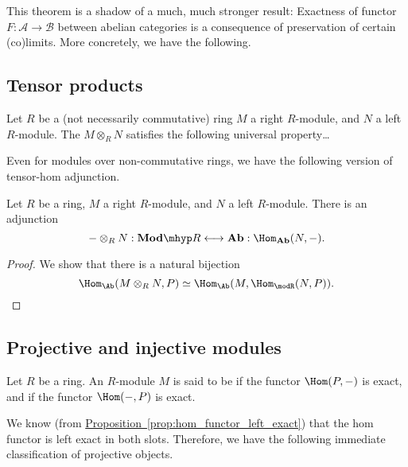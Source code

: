 \documentclass[main.tex]{subfiles}
\begin{document}
This theorem is a shadow of a much, much stronger result: Exactness of functor $F\colon \mathcal{A} \to \mathcal{B}$ between abelian categories is a consequence of preservation of certain (co)limits. More concretely, we have the following.

\subsection{Tensor products}
\label{ssc:tensor_products}

\begin{definition}
  \label{def:tensor_product}
  Let $R$ be a (not necessarily commutative) ring $M$ a right $R$-module, and $N$ a left $R$-module. The  $M \otimes_{R} N$ satisfies the following universal property\dots
\end{definition}

Even for modules over non-commutative rings, we have the following version of tensor-hom adjunction.
\begin{proposition}
  Let $R$ be a ring, $M$ a right $R$-module, and $N$ a left $R$-module. There is an adjunction
  \begin{equation*}
    - \otimes_{R} N : \mathbf{Mod}\mhyp R \longleftrightarrow \mathbf{Ab} : \Hom_{\mathbf{Ab}}(N, -).
  \end{equation*}
\end{proposition}
\begin{proof}
  We show that there is a natural bijection
  \begin{equation*}
    \Hom_{\Ab}(M \otimes_{R} N, P) \simeq \Hom_{\Ab}(M, \Hom_{\modR}(N, P)).
  \end{equation*}
\end{proof}

\subsection{Projective and injective modules}
\label{ssc:projective_and_injective_modules}

\begin{definition}
  \label{def:projective_injective_module}
  Let $R$ be a ring. An $R$-module $M$ is said to be  if the functor $\Hom(P, -)$ is exact, and  if the functor $\Hom(-, P)$ is exact.
\end{definition}

We know (from \hyperref[prop:hom_functor_left_exact]{Proposition~\ref*{prop:hom_functor_left_exact}}) that the hom functor is left exact in both slots. Therefore, we have the following immediate classification of projective objects.
\end{document}
